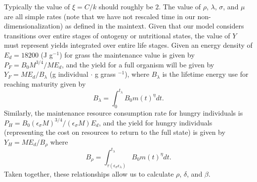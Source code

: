\documentclass[twocolumn,preprintnumbers,amsmath,amssymb,superscriptaddress]{revtex4}
\begin{document}
\begin{bibunit}[unsrt]

Typically the value of $\xi=C/k$ should roughly be $2$. The value of $\rho$, $\lambda$, $\sigma$, and $\mu$ are all simple rates (note that we have not rescaled time in our non-dimensionalization) as defined in the maintext. Given that our model considers transitions over entire stages of ontogeny or nutritional states, the value of $Y$ must represent yields integrated over entire life stages. Given an energy density of $E_{d}=18200$ (J g$^{-1}$) for grass \citep{estermann} the maintenance value is given by $P_{F}=B_{0}M^{3/4}/ME_{d}$, and the yield for a full organism will be given by $Y_{F}=ME_{d}/B_{\lambda}$ (g individual $\cdot$ g grass $^{-1}$), where $B_{\lambda}$ is the lifetime energy use for reaching maturity given by
\begin{equation}
B_{\lambda}=\int_{0}^{t_{\lambda}}B_{0}m\left(t\right)^{\eta}dt.
\end{equation}
Similarly, the maintenance resource consumption rate for hungry individuals is $P_{H}=B_{0}(\epsilon_{\sigma}M)^{3/4}/(\epsilon_{\sigma}M)E_{d}$, and the yield for hungry individuals (representing the cost on resources to return to the full state) is given by $Y_{H}=ME_{d}/B_{\rho}$ where
\begin{equation}
B_{\rho}=\int_{\tau\left(\epsilon_{\sigma}\epsilon_{\lambda}\right)}^{t_{\lambda}}B_{0}m\left(t\right)^{\eta}dt.
\end{equation}
Taken together, these relationships allow us to calculate $\rho$, $\delta$, and $\beta$.


\end{bibunit}
\end{document}
